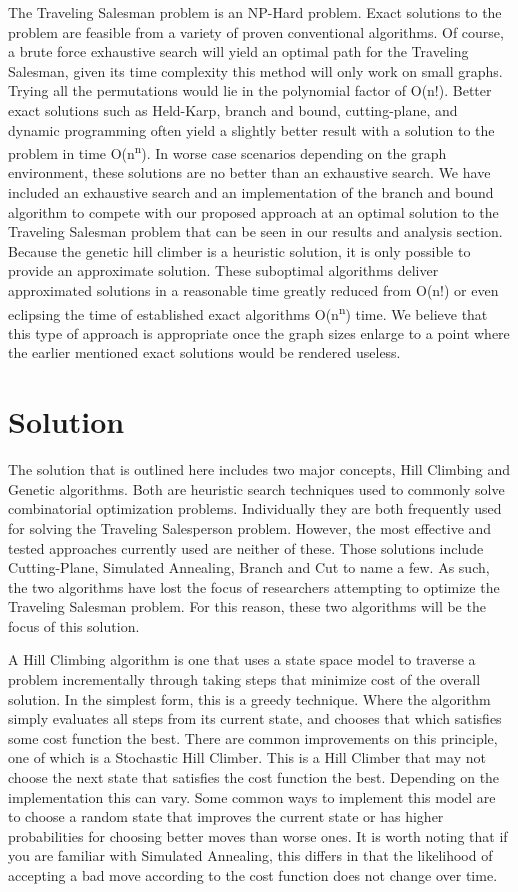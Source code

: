 \documentclass[sigplan,screen]{acmart}
\begin{document}
The Traveling Salesman problem is an NP-Hard problem. Exact solutions to the
problem are feasible from a variety of proven conventional algorithms. Of
course, a brute force exhaustive search will yield an optimal path for the
Traveling Salesman, given its time complexity this method will only work on
small graphs. Trying all the permutations would lie in the polynomial factor of
O(n!). Better exact solutions such as Held-Karp, branch and bound,
cutting-plane, and dynamic programming often yield a slightly better result with
a solution to the problem in time O(n\textsuperscript{n}). In worse case
scenarios depending on the graph environment, these solutions are no better than
an exhaustive search. We have included an exhaustive search and an
implementation of the branch and bound algorithm to compete with our proposed
approach at an optimal solution to the Traveling Salesman problem that can be
seen in our results and analysis section. Because the genetic hill climber is a
heuristic solution, it is only possible to provide an approximate solution.
These suboptimal algorithms deliver approximated solutions in a reasonable time
greatly reduced from O(n!) or even eclipsing the time of established exact
algorithms O(n\textsuperscript{n}) time. We believe that this type of approach
is appropriate once the graph sizes enlarge to a point where the earlier
mentioned exact solutions would be rendered useless.

\section{Solution}
The solution that is outlined here includes two major concepts, Hill Climbing
and Genetic algorithms. Both are heuristic search techniques used to commonly
solve combinatorial optimization problems. Individually they are both frequently
used for solving the Traveling Salesperson problem. However, the most effective
and tested approaches currently used are neither of these. Those solutions
include Cutting-Plane, Simulated Annealing, Branch and Cut to name a few. As
such, the two algorithms have lost the focus of researchers attempting to
optimize the Traveling Salesman problem. For this reason, these two algorithms
will be the focus of this solution.

A Hill Climbing algorithm is one that uses a state space model to traverse a
problem incrementally through taking steps that minimize cost of the overall
solution. In the simplest form, this is a greedy technique. Where the algorithm
simply evaluates all steps from its current state, and chooses that which
satisfies some cost function the best. There are common improvements on this
principle, one of which is a Stochastic Hill Climber. This is a Hill Climber
that may not choose the next state that satisfies the cost function the best.
Depending on the implementation this can vary. Some common ways to implement
this model are to choose a random state that improves the current state or has
higher probabilities for choosing better moves than worse ones. It is worth
noting that if you are familiar with Simulated Annealing, this differs in that
the likelihood of accepting a bad move according to the cost function does not
change over time.
\end{document}
